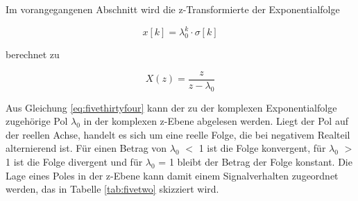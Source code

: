 \noindent Im vorangegangenen Abschnitt wird die z-Transformierte der Exponentialfolge 

\begin{equation}\label{eq:fivethirtythree}
x\left[k\right]=\lambda _{0}^{k} \cdot \sigma \left[k\right]
\end{equation}

\noindent berechnet zu

\begin{equation}\label{eq:fivethirtyfour}
X\left(z\right)=\frac{z}{z-\lambda _{0} }
\end{equation}

\noindent Aus Gleichung \eqref{eq:fivethirtyfour} kann der zu der komplexen Exponentialfolge zugeh\"{o}rige Pol $\lambda_{0}$ in der komplexen z-Ebene abgelesen werden. Liegt der Pol auf der reellen Achse, handelt es sich um eine reelle Folge, die bei negativem Realteil alternierend ist. F\"{u}r einen Betrag von {\textbar}$\lambda_{0}${\textbar} $\mathrm{<}$ 1 ist die Folge konvergent, f\"{u}r {\textbar}$\lambda_{0}${\textbar} $\mathrm{>}$ 1 ist die Folge divergent und f\"{u}r {\textbar}$\lambda_{0}${\textbar} = 1 bleibt der Betrag der Folge konstant. Die Lage eines Poles in der z-Ebene kann damit einem Signalverhalten zugeordnet werden, das in Tabelle \ref{tab:fivetwo} skizziert wird.

\clearpage

